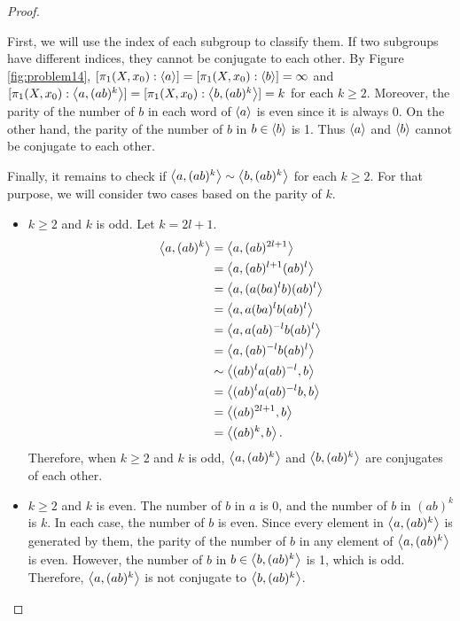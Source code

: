\documentclass[12pt, psamsfonts]{amsart}
\theoremstyle{definition}
\theoremstyle{remark}
\numberwithin{equation}{section}
\begin{document}
\begin{proof}
\begin{itemize}
      First, we will use the index of each subgroup to classify them.
      If two subgroups have different indices, they cannot be conjugate to each other.
      By Figure \ref{fig:problem14}, $[\pi_1(X, x_0): \ev{a}] = [\pi_1(X, x_0): \ev{b}] = \infty$ and $[\pi_1(X, x_0): \ev{a, (ab)^k}] = [\pi_1(X, x_0): \ev{b, (ab)^k}] = k$ for each $k \geq 2$.
      Moreover, the parity of the number of $b$ in each word of $\ev{a}$ is even since it is always 0.
      On the other hand, the parity of the number of $b$ in $b \in \ev{b}$ is 1.
      Thus $\ev{a}$ and $\ev{b}$ cannot be conjugate to each other.

      Finally, it remains to check if $\ev{a, (ab)^k} \sim \ev{b, (ab)^k}$ for each $k \geq 2$.
      For that purpose, we will consider two cases based on the parity of $k$.
      \begin{itemize}
        \item
          $k \geq 2$ and $k$ is odd.
          Let $k = 2l + 1$.
          \begin{align*}
            \ev{a, (ab)^k}
              &= \ev{a, (ab)^{2l + 1}} \\
              &= \ev{a, (ab)^{l + 1}(ab)^l} \\
              &= \ev{a, (a(ba)^lb)(ab)^l} \\
              &= \ev{a, a(ba)^lb(ab)^l} \\
              &= \ev{a, a(ab)^{-l}b(ab)^l} \\
              &= \ev{a, (ab)^{-l}b(ab)^l} \\
              &\sim \ev{(ab)^la(ab)^{-l}, b} \\
              &= \ev{(ab)^la(ab)^{-l}b, b} \\
              &= \ev{(ab)^{2l + 1}, b} \\
              &= \ev{(ab)^{k}, b}.
          \end{align*}
          Therefore, when $k \geq 2$ and $k$ is odd, $\ev{a, (ab)^k}$ and $\ev{b, (ab)^k}$ are conjugates of each other.
        \item
          $k \geq 2$ and $k$ is even.
          The number of $b$ in $a$ is 0, and the number of $b$ in $(ab)^k$ is $k$.
          In each case, the number of $b$ is even.
          Since every element in $\ev{a, (ab)^k}$ is generated by them, the parity of the number of $b$ in any element of $\ev{a, (ab)^k}$ is even.
          However, the number of $b$ in $b \in \ev{b, (ab)^k}$ is 1, which is odd.
          Therefore, $\ev{a, (ab)^k}$ is not conjugate to $\ev{b, (ab)^k}$.

\end{itemize}
\end{itemize}
\end{proof}
\end{document}
